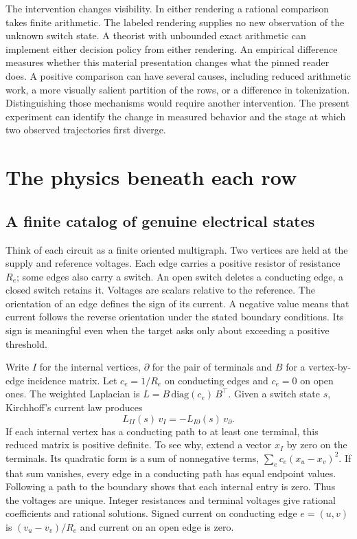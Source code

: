 \documentclass[12pt,letterpaper]{article}
\begin{document}
The intervention changes visibility. In either rendering a rational comparison takes finite arithmetic. The labeled rendering supplies no new observation of the unknown switch state. A theorist with unbounded exact arithmetic can implement either decision policy from either rendering. An empirical difference measures whether this material presentation changes what the pinned reader does. A positive comparison can have several causes, including reduced arithmetic work, a more visually salient partition of the rows, or a difference in tokenization. Distinguishing those mechanisms would require another intervention. The present experiment can identify the change in measured behavior and the stage at which two observed trajectories first diverge.

\section{The physics beneath each row}

\subsection{A finite catalog of genuine electrical states}

Think of each circuit as a finite oriented multigraph. Two vertices are held at the supply and reference voltages. Each edge carries a positive resistor of resistance $R_e$; some edges also carry a switch. An open switch deletes a conducting edge, a closed switch retains it. Voltages are scalars relative to the reference. The orientation of an edge defines the sign of its current. A negative value means that current follows the reverse orientation under the stated boundary conditions. Its sign is meaningful even when the target asks only about exceeding a positive threshold.

Write $I$ for the internal vertices, $\partial$ for the pair of terminals and $B$ for a vertex-by-edge incidence matrix. Let $c_e=1/R_e$ on conducting edges and $c_e=0$ on open ones. The weighted Laplacian is $L=B\,\mathrm{diag}(c_e)\,B^\top$. Given a switch state $s$, Kirchhoff's current law produces
\[
              L_{II}(s)\, v_I=-L_{I\partial}(s)\,v_\partial .
\]
If each internal vertex has a conducting path to at least one terminal, this reduced matrix is positive definite. To see why, extend a vector $x_I$ by zero on the terminals. Its quadratic form is a sum of nonnegative terms, $\sum_e c_e(x_u-x_v)^2$. If that sum vanishes, every edge in a conducting path has equal endpoint values. Following a path to the boundary shows that each internal entry is zero. Thus the voltages are unique. Integer resistances and terminal voltages give rational coefficients and rational solutions. Signed current on conducting edge $e=(u,v)$ is $(v_u-v_v)/R_e$ and current on an open edge is zero.
\end{document}
